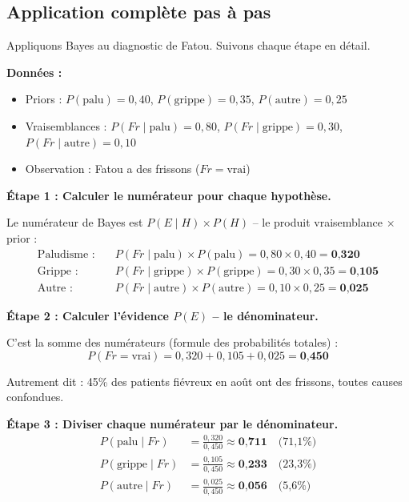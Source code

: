 \documentclass[11pt,a4paper]{article}
\begin{document}
\subsection{Application complète pas à pas}

Appliquons Bayes au diagnostic de Fatou. Suivons chaque étape en détail.

\textbf{Données :}
\begin{itemize}[nosep]
    \item Priors : $P(\text{palu}) = 0{,}40$, \; $P(\text{grippe}) = 0{,}35$, \; $P(\text{autre}) = 0{,}25$
    \item Vraisemblances : $P(Fr \mid \text{palu}) = 0{,}80$, \; $P(Fr \mid \text{grippe}) = 0{,}30$, \; $P(Fr \mid \text{autre}) = 0{,}10$
    \item Observation : Fatou a des frissons ($Fr = \text{vrai}$)
\end{itemize}

\textbf{Étape 1 : Calculer le numérateur pour chaque hypothèse.}

Le numérateur de Bayes est $P(E \mid H) \times P(H)$ -- le produit vraisemblance $\times$ prior :
\begin{align*}
\text{Paludisme :} \quad & P(Fr \mid \text{palu}) \times P(\text{palu}) = 0{,}80 \times 0{,}40 = \textbf{0,320} \\
\text{Grippe :} \quad & P(Fr \mid \text{grippe}) \times P(\text{grippe}) = 0{,}30 \times 0{,}35 = \textbf{0,105} \\
\text{Autre :} \quad & P(Fr \mid \text{autre}) \times P(\text{autre}) = 0{,}10 \times 0{,}25 = \textbf{0,025}
\end{align*}

\textbf{Étape 2 : Calculer l'évidence $P(E)$ -- le dénominateur.}

C'est la somme des numérateurs (formule des probabilités totales) :
$$P(Fr = \text{vrai}) = 0{,}320 + 0{,}105 + 0{,}025 = \textbf{0,450}$$

Autrement dit  : 45\% des patients fiévreux en août ont des frissons, toutes causes confondues.

\textbf{Étape 3 : Diviser chaque numérateur par le dénominateur.}
\begin{align*}
P(\text{palu} \mid Fr) &= \frac{0{,}320}{0{,}450} \approx \textbf{0,711} \quad \text{(71,1\%)} \\[3pt]
P(\text{grippe} \mid Fr) &= \frac{0{,}105}{0{,}450} \approx \textbf{0,233} \quad \text{(23,3\%)} \\[3pt]
P(\text{autre} \mid Fr) &= \frac{0{,}025}{0{,}450} \approx \textbf{0,056} \quad \text{(5,6\%)}
\end{align*}
\end{document}
